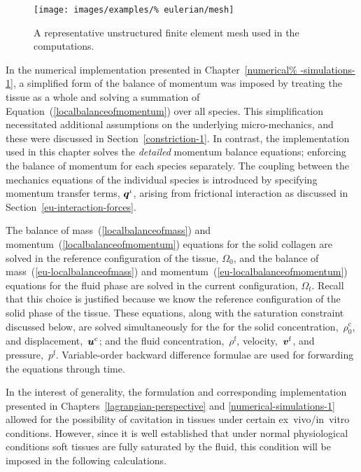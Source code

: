 \begin{figure}[ht]
  \centering
  \texttt{[image: images/examples/\%
    eulerian/mesh]}
  \caption{A representative unstructured finite element mesh used in
    the computations.}
  \label{egmesh2d}
\end{figure}

In the numerical implementation presented in Chapter~\ref{numerical%
  -simulations-1}, a simplified form of the balance of momentum was
imposed by treating the tissue as a whole and solving a summation of
Equation~(\ref{localbalanceofmomentum}) over all species. This
simplification necessitated additional assumptions on the underlying
micro-mechanics, and these were discussed in
Section~\ref{constriction-1}. In contrast, the implementation used in
this chapter solves the {\em detailed} momentum balance equations;
enforcing the balance of momentum for each species separately. The
coupling between the mechanics equations of the individual species is
introduced by specifying momentum transfer terms, $\mbox{\boldmath$ q$}^{\iota}$,
arising from frictional interaction as discussed in
Section~\ref{eu-interaction-forces}.

The balance of mass~(\ref{localbalanceofmass}) and
momentum~(\ref{localbalanceofmomentum}) equations for the solid
collagen are solved in the reference configuration of the tissue,
$\Omega_{0}$, and the balance of mass~(\ref{eu-localbalanceofmass})
and momentum~(\ref{eu-localbalanceofmomentum}) equations for the fluid
phase are solved in the current configuration, $\Omega_{t}$. Recall
that this choice is justified because we know the reference
configuration of the solid phase of the tissue. These equations, along
with the saturation constraint discussed below, are solved
simultaneously for the for the solid
concentration,~$\rho_{0}^{\mathrm{c}}$, and
displacement,~$\mbox{\boldmath$ u$}^{\mathrm{c}}$; and the fluid
concentration,~$\rho^{\mathrm{f}}$, velocity,~$\mbox{\boldmath$ v$}^{\mathrm{f}}$, and
pressure,~$p^{\mathrm{f}}$. Variable-order backward difference
formulae \citep{leveque2007} are used for forwarding the equations
through time.

In the interest of generality, the formulation and corresponding
implementation presented in Chapters~\ref{lagrangian-perspective} and
\ref{numerical-simulations-1} allowed for the possibility of
cavitation in tissues under certain ex~vivo/in~vitro
conditions. However, since it is well established that under normal
physiological conditions soft tissues are fully saturated by the
fluid, this condition will be imposed in the following calculations.

